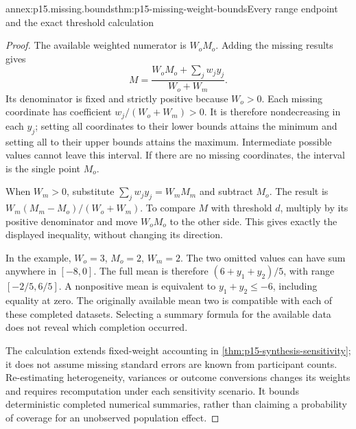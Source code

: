 \begin{annexitem}{annex:p15.missing.bounds}{thm:p15-missing-weight-bounds}{Every range endpoint and the exact threshold calculation}
\begin{proof}
The available weighted numerator is \(W_oM_o\). Adding the
missing results gives
\[
        M=\frac{W_oM_o+\sum_jw_jy_j}{W_o+W_m}.
\]
Its denominator is fixed and strictly positive because \(W_o>0\).
Each missing coordinate has coefficient \(w_j/(W_o+W_m)>0\).
It is therefore nondecreasing in each \(y_j\); setting all
coordinates to their lower bounds attains the minimum and setting
all to their upper bounds attains the maximum. Intermediate possible
values cannot leave this interval. If there are no missing coordinates,
the interval is the single point \(M_o\).

When \(W_m>0\), substitute
\(\sum_jw_jy_j=W_mM_m\) and subtract \(M_o\). The
result is \(W_m(M_m-M_o)/(W_o+W_m)\). To compare \(M\)
with threshold \(d\), multiply by its positive denominator
and move \(W_oM_o\) to the other side. This gives exactly
the displayed inequality, without changing its direction.

In the example, \(W_o=3\), \(M_o=2\), \(W_m=2\).
The two omitted values can have sum anywhere in \([-8,0]\).
The full mean is therefore \((6+y_1+y_2)/5\), with range
\([-2/5,6/5]\). A nonpositive mean is equivalent to
\(y_1+y_2\leq-6\), including equality at zero.
The originally available mean two is compatible with each of
these completed datasets. Selecting a summary formula for the
available data does not reveal which completion occurred.

The calculation extends fixed-weight accounting in
\cref{thm:p15-synthesis-sensitivity}; it does not assume missing
standard errors are known from participant counts. Re-estimating
heterogeneity, variances or outcome conversions changes its weights
and requires recomputation under each sensitivity scenario.
It bounds deterministic completed numerical summaries, rather than
claiming a probability of coverage for an unobserved population effect.
\end{proof}
\end{annexitem}

